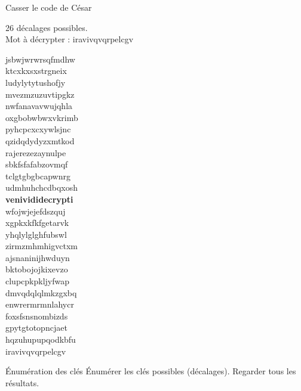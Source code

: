 \documentclass{beamer}
\begin{document}
\begin{frame}{Casser le code de César}
\begin{block}{}
  26 décalages possibles.\\
  Mot à décrypter :  iravivqvqrpelcgv 
\end{block}
  

\footnotesize
jsbwjwrwrsqfmdhw\\
ktcxkxsxstrgneix\\
ludylytytushofjy\\
mvezmzuzuvtipgkz\\
nwfanavavwujqhla\\
oxgbobwbwxvkrimb\\
pyhcpcxcxywlsjnc\\
qzidqdydyzxmtkod\\
rajerezezaynulpe\\
sbkfsfafabzovmqf\\
tclgtgbgbcapwnrg\\
udmhuhchcdbqxosh\\
\textbf{venivididecrypti}\\
wfojwjejefdszquj\\
xgpkxkfkfgetarvk\\
yhqlylglghfubswl\\
zirmzmhmhigvctxm\\
ajsnaninijhwduyn\\
bktobojojkixevzo\\
clupcpkpkljyfwap\\
dmvqdqlqlmkzgxbq\\
enwrermrmnlahycr\\
foxsfsnsnombizds\\
gpytgtotopncjaet\\
hqzuhupupqodkbfu\\
iravivqvqrpelcgv\\
\normalsize
  \end{frame}

\begin{frame}{Énumération des clés}
  Énumérer les clés possibles (décalages). Regarder tous les résultats.
  \end{frame}
\end{document}
